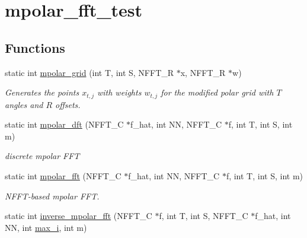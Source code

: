 \hypertarget{group__applications__polarFFT__mpolar}{\section{mpolar\-\_\-fft\-\_\-test}
\label{group__applications__polarFFT__mpolar}
}
\subsection*{Functions}
\begin{DoxyCompactItemize}
\item 
static int \hyperlink{group__applications__polarFFT__mpolar_gabafb31c78ad6868b6689449a9b0cfeb8}{mpolar\-\_\-grid} (int T, int S, N\-F\-F\-T\-\_\-\-R $\ast$x, N\-F\-F\-T\-\_\-\-R $\ast$w)
\begin{DoxyCompactList}\small\item\em Generates the points $x_{t,j}$ with weights $w_{t,j}$ for the modified polar grid with $T$ angles and $R$ offsets. \end{DoxyCompactList}\item 
\hypertarget{group__applications__polarFFT__mpolar_ga5c6c054600731628d73aaf1891b180d2}{static int \hyperlink{group__applications__polarFFT__mpolar_ga5c6c054600731628d73aaf1891b180d2}{mpolar\-\_\-dft} (N\-F\-F\-T\-\_\-\-C $\ast$f\-\_\-hat, int N\-N, N\-F\-F\-T\-\_\-\-C $\ast$f, int T, int S, int m)}\label{group__applications__polarFFT__mpolar_ga5c6c054600731628d73aaf1891b180d2}

\begin{DoxyCompactList}\small\item\em discrete mpolar F\-F\-T \end{DoxyCompactList}\item 
\hypertarget{group__applications__polarFFT__mpolar_gaa75a8d6168898b9a537019ee96166ca9}{static int \hyperlink{group__applications__polarFFT__mpolar_gaa75a8d6168898b9a537019ee96166ca9}{mpolar\-\_\-fft} (N\-F\-F\-T\-\_\-\-C $\ast$f\-\_\-hat, int N\-N, N\-F\-F\-T\-\_\-\-C $\ast$f, int T, int S, int m)}\label{group__applications__polarFFT__mpolar_gaa75a8d6168898b9a537019ee96166ca9}

\begin{DoxyCompactList}\small\item\em N\-F\-F\-T-\/based mpolar F\-F\-T. \end{DoxyCompactList}\item 
\hypertarget{group__applications__polarFFT__mpolar_ga726b3cdc5ce7c12a953988532bdef2f3}{static int \hyperlink{group__applications__polarFFT__mpolar_ga726b3cdc5ce7c12a953988532bdef2f3}{inverse\-\_\-mpolar\-\_\-fft} (N\-F\-F\-T\-\_\-\-C $\ast$f, int T, int S, N\-F\-F\-T\-\_\-\-C $\ast$f\-\_\-hat, int N\-N, int \hyperlink{group__applications__fastsum_ga6bc571f685f894e15b83a848a0a30faa}{max\-\_\-i}, int m)}\label{group__applications__polarFFT__mpolar_ga726b3cdc5ce7c12a953988532bdef2f3}


\end{DoxyCompactItemize}
